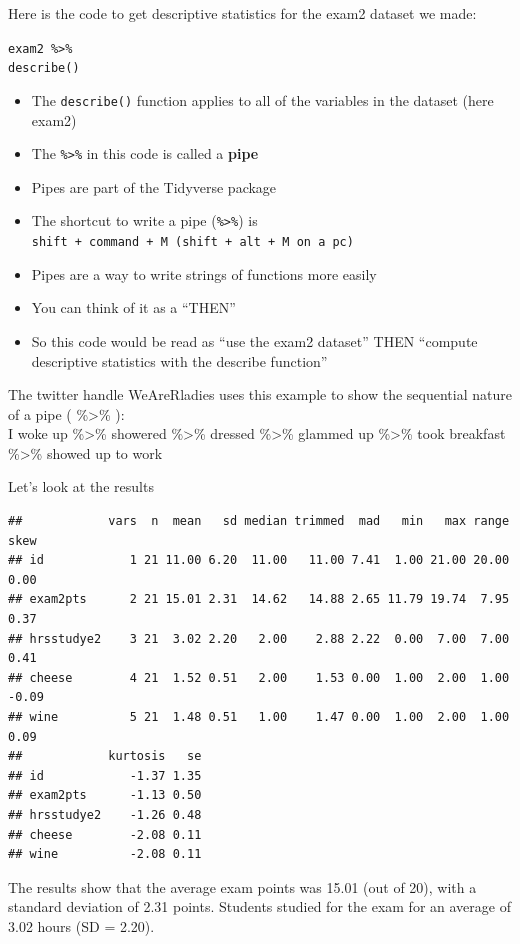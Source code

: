 \documentclass[
]{book}
\providecommand{\tightlist}{%
  \setlength{\itemsep}{0pt}\setlength{\parskip}{0pt}}
\begin{document}
Here is the code to get descriptive statistics for the exam2 dataset we made:

\texttt{exam2\ \%\textgreater{}\%}\\
\texttt{describe()}

\begin{itemize}
\tightlist
\item
  The \texttt{describe()} function applies to all of the variables in the dataset (here exam2)
\item
  The \texttt{\%\textgreater{}\%} in this code is called a \textbf{pipe}
\item
  Pipes are part of the Tidyverse package
\item
  The shortcut to write a pipe (\texttt{\%\textgreater{}\%}) is \texttt{shift\ +\ command\ +\ M\ (shift\ +\ alt\ +\ M\ on\ a\ pc)}
\item
  Pipes are a way to write strings of functions more easily
\item
  You can think of it as a ``THEN''
\item
  So this code would be read as ``use the exam2 dataset'' THEN ``compute descriptive statistics with the describe function''
\end{itemize}

The twitter handle WeAreRladies uses this example to show the sequential nature of a pipe ( \%\textgreater\% ):\\
I woke up \%\textgreater\% showered \%\textgreater\% dressed \%\textgreater\% glammed up \%\textgreater\% took breakfast \%\textgreater\% showed up to work

Let's look at the results

\begin{verbatim}
##            vars  n  mean   sd median trimmed  mad   min   max range  skew
## id            1 21 11.00 6.20  11.00   11.00 7.41  1.00 21.00 20.00  0.00
## exam2pts      2 21 15.01 2.31  14.62   14.88 2.65 11.79 19.74  7.95  0.37
## hrsstudye2    3 21  3.02 2.20   2.00    2.88 2.22  0.00  7.00  7.00  0.41
## cheese        4 21  1.52 0.51   2.00    1.53 0.00  1.00  2.00  1.00 -0.09
## wine          5 21  1.48 0.51   1.00    1.47 0.00  1.00  2.00  1.00  0.09
##            kurtosis   se
## id            -1.37 1.35
## exam2pts      -1.13 0.50
## hrsstudye2    -1.26 0.48
## cheese        -2.08 0.11
## wine          -2.08 0.11
\end{verbatim}

The results show that the average exam points was 15.01 (out of 20), with a standard deviation of 2.31 points. Students studied for the exam for an average of 3.02 hours (SD = 2.20).
\end{document}
